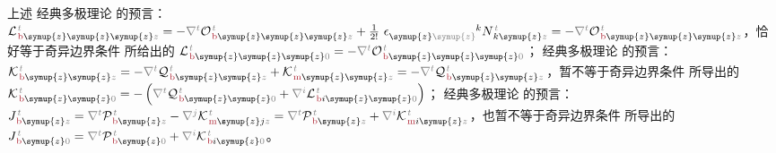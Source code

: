 上述 {\one} 经典多极理论  的预言：${\mathcal{L}}^{\;\!\mathcolor{gray}{t}}_{\;\!\textcolor{Maroon}{\text{b}} \symup{z} \symup{z} \symup{z} \mathcolor{gray}{z}} = - \mathcolor{gray}{\nabla^t} {\mathcal{O}}^{\;\!\mathcolor{gray}{t}}_{\;\!\textcolor{Maroon}{\text{b}} \symup{z} \symup{z} \symup{z} \mathcolor{gray}{z}} + \frac{1}{2!}~ \epsilon^{\hphantom{\symup{z} \symup{z}}k}_{\symup{z} \mathcolor{gray}{\symup{z}}} N^{\;\!\mathcolor{gray}{t}}_{\;\! k\symup{z}\mathcolor{gray}{z}} = - \mathcolor{gray}{\nabla^t} {\mathcal{O}}^{\;\!\mathcolor{gray}{t}}_{\;\!\textcolor{Maroon}{\text{b}} \symup{z} \symup{z} \symup{z} \mathcolor{gray}{z}}$，恰好等于奇异边界条件  所给出的 ${\mathcal{L}}^{\;\!\mathcolor{gray}{t}}_{\;\!\textcolor{Maroon}{\text{b}} \symup{z} \symup{z} \symup{z} \mathcolor{gray}{0}} = - \mathcolor{gray}{\nabla^t} {\mathcal{O}}^{\;\!\mathcolor{gray}{t}}_{\;\!\textcolor{Maroon}{\text{b}} \symup{z} \symup{z} \symup{z} \mathcolor{gray}{0}}$；{\two} 经典多极理论  的预言：${\mathcal{K}}^{\;\!\mathcolor{gray}{t}}_{\;\!\textcolor{Maroon}{\text{b}} \symup{z} \symup{z} \mathcolor{gray}{z}} = - \mathcolor{gray}{\nabla^t} {\mathcal{Q}}^{\;\!\mathcolor{gray}{t}}_{\;\!\textcolor{Maroon}{\text{b}} \symup{z} \symup{z} \mathcolor{gray}{z}} + {\mathcal{K}}^{\;\!\mathcolor{gray}{t}}_{\;\!\textcolor{Maroon}{\text{m}} \symup{z} \symup{z} \mathcolor{gray}{z}} = - \mathcolor{gray}{\nabla^t} {\mathcal{Q}}^{\;\!\mathcolor{gray}{t}}_{\;\!\textcolor{Maroon}{\text{b}} \symup{z} \symup{z} \mathcolor{gray}{z}}$，暂不等于奇异边界条件  所导出的 ${\mathcal{K}}^{\;\!\mathcolor{gray}{t}}_{\;\!\textcolor{Maroon}{\text{b}} \symup{z} \symup{z} \mathcolor{gray}{0}} = - \left( \mathcolor{gray}{\nabla^t} {\mathcal{Q}}^{\;\!\mathcolor{gray}{t}}_{\;\!\textcolor{Maroon}{\text{b}} \symup{z} \symup{z} \mathcolor{gray}{0}} + \mathcolor{gray}{\nabla^i} {\mathcal{L}}^{\;\!\mathcolor{gray}{t}}_{\;\!\textcolor{Maroon}{\text{b}} i\symup{z} \symup{z} \mathcolor{gray}{0}} \right)$；{\three} 经典多极理论  的预言：${J}^{\;\!\mathcolor{gray}{t}}_{\;\!\textcolor{Maroon}{\text{b}} \symup{z} \mathcolor{gray}{z}} = \mathcolor{gray}{\nabla^t} {\mathcal{P}}^{\;\!\mathcolor{gray}{t}}_{\;\!\textcolor{Maroon}{\text{b}} \symup{z} \mathcolor{gray}{z}} - \mathcolor{gray}{\nabla^j} {\mathcal{K}}^{\;\!\mathcolor{gray}{t}}_{\;\!\textcolor{Maroon}{\text{m}} \symup{z}j \mathcolor{gray}{z}} = \mathcolor{gray}{\nabla^t} {\mathcal{P}}^{\;\!\mathcolor{gray}{t}}_{\;\!\textcolor{Maroon}{\text{b}} \symup{z} \mathcolor{gray}{z}} + \mathcolor{gray}{\nabla^i} {\mathcal{K}}^{\;\!\mathcolor{gray}{t}}_{\;\!\textcolor{Maroon}{\text{m}} i\symup{z} \mathcolor{gray}{z}}$，也暂不等于奇异边界条件  所导出的 ${J}^{\;\!\mathcolor{gray}{t}}_{\;\!\textcolor{Maroon}{\text{b}} \symup{z} \mathcolor{gray}{0}} = \mathcolor{gray}{\nabla^t} {\mathcal{P}}^{\;\!\mathcolor{gray}{t}}_{\;\!\textcolor{Maroon}{\text{b}} \symup{z} \mathcolor{gray}{0}} + \mathcolor{gray}{\nabla^i} {\mathcal{K}}^{\;\!\mathcolor{gray}{t}}_{\;\!\textcolor{Maroon}{\text{b}} i\symup{z}\mathcolor{gray}{0}}$。

